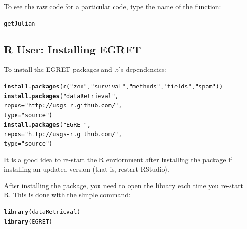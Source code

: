 \documentclass[a4paper,11pt]{article}\usepackage{graphicx, color}
\makeatletter
\newcommand{\hlfunctioncall}[1]{\textcolor[rgb]{0.501960784313725,0,0.329411764705882}{\textbf{#1}}}%
\newcommand{\hlstring}[1]{\textcolor[rgb]{0.6,0.6,1}{#1}}%
\newenvironment{kframe}{%
 \def\at@end@of@kframe{}%
 \ifinner\ifhmode%
  \def\at@end@of@kframe{\end{minipage}}%
  \begin{minipage}{\columnwidth}%
 \fi\fi%
 \def\FrameCommand##1{\hskip\@totalleftmargin \hskip-\fboxsep
 \colorbox{shadecolor}{##1}\hskip-\fboxsep
     \hskip-\linewidth \hskip-\@totalleftmargin \hskip\columnwidth}%
 \MakeFramed {\advance\hsize-\width
   \@totalleftmargin\z@ \linewidth\hsize
   \@setminipage}}%
 {\par\unskip\endMakeFramed%
 \at@end@of@kframe}
\newenvironment{knitrout}{}{} %
\makeatother
\begin{document}
To see the raw code for a particular code, type the name of the function:
\begin{knitrout}
\color{fgcolor}\begin{kframe}
\begin{alltt}
getJulian
\end{alltt}
\end{kframe}
\end{knitrout}



\subsection{R User: Installing EGRET}
To install the EGRET packages and it's dependencies:

\begin{knitrout}
\color{fgcolor}\begin{kframe}
\begin{alltt}
\hlfunctioncall{install.packages}(\hlfunctioncall{c}(\hlstring{"zoo"},\hlstring{"survival"},\hlstring{"methods"},\hlstring{"fields"},\hlstring{"spam"}))
\hlfunctioncall{install.packages}(\hlstring{"dataRetrieval"}, 
                 repos=\hlstring{"http://usgs-r.github.com/"}, 
                 type=\hlstring{"source"})
\hlfunctioncall{install.packages}(\hlstring{"EGRET"}, 
                 repos=\hlstring{"http://usgs-r.github.com/"}, 
                 type=\hlstring{"source"})
\end{alltt}
\end{kframe}
\end{knitrout}


It is a good idea to re-start the R enviornment after installing the package if installing an updated version (that is, restart RStudio). 

After installing the package, you need to open the library each time you re-start R.  This is done with the simple command:
\begin{knitrout}
\color{fgcolor}\begin{kframe}
\begin{alltt}
\hlfunctioncall{library}(dataRetrieval)
\hlfunctioncall{library}(EGRET)
\end{alltt}
\end{kframe}
\end{knitrout}
\end{document}
